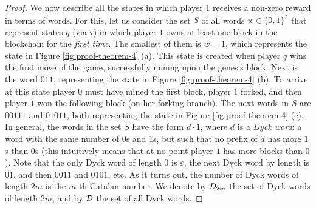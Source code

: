 \begin{proof}




We now describe all the states in which player 1 receives a non-zero reward in terms of words. For this, let us consider the set $S$ of all words $w \in \{0,1\}^*$ that represent states $q$ (via $\tau$) in which player $1$ owns at least one block in the blockchain for the {\em first time}. 
The smallest of them is $w = 1$, which represents the state in Figure \ref{fig:proof-theorem-4} (a). This state is created when player $q$ wins the first move of the game, successfully mining upon the genesis block. Next is the word $011$, representing the state in Figure \ref{fig:proof-theorem-4} (b). To arrive at this state player $0$ must have mined the first block, player $1$ forked, and then player $1$ 
won the following block (on her forking branch). The next words in $S$ are $00111$ and $01011$, both representing the state in Figure \ref{fig:proof-theorem-4} (c). 
In general, the words in the set $S$ have the form $d\cdot 1$, where $d$ is a \emph{Dyck word}: a word with the same number of $0$s and $1$s, but such that 
no prefix of $d$ has more $1$s than $0$s (this intuitively means that at no point player $1$ has more blocks than $0$). Note that the only Dyck word of length $0$ is $\varepsilon$, the next Dyck word by length is $01$, and then $0011$ and $0101$, etc. As it turns out, the number of Dyck words of length $2m$ is the $m$-th Catalan number. We denote by $\mathcal{D}_{2m}$ the set of Dyck words of length $2m$, and by $\mathcal{D}$ the set of all Dyck words.


\end{proof}
